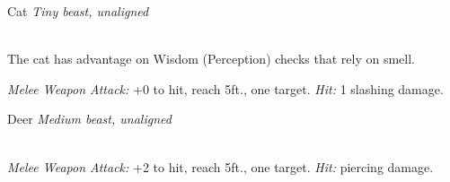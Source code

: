 \documentclass[10pt,twoside,twocolumn,openany]{book}
\begin{document}
\begin{monsterboxnobg}{Cat}
	\textit{Tiny beast, unaligned}\\
	\hline
	\basics[
		armorclass	= 12,
		hitpoints 		= \dice{1d4},
		speed		= {40 ft., climb 30 ft.}
	]
	\hline
	\stats[
		STR	= \stat{3},
		DEX	= \stat{15},
		CON	= \stat{10},
		INT	= \stat{3},
		WIS	= \stat{12},
		CHA	= \stat{7}
	]
	\hline
	\details[
		skills			= {Perception +3, Stealth +4},
		senses		= {passive Perception 13},
		languages		= {-},
		challenge		= 0
	]
	\hline \\[1mm]
	\begin{monsteraction}
		The cat has advantage on Wisdom (Perception) checks that rely on smell.
	\end{monsteraction}
	\begin{monsteraction}[Claws]
		\textit{Melee Weapon Attack:} +0 to hit, reach 5ft., one target. \textit{Hit:} 1 slashing damage.
	\end{monsteraction}
\end{monsterboxnobg}

\begin{monsterboxnobg}{Deer}
	\textit{Medium beast, unaligned}\\
	\hline
	\basics[
		armorclass	= 13,
		hitpoints 		= \dice{1d8},
		speed		= {50 ft.}
	]
	\hline
	\stats[
		STR	= \stat{11},
		DEX	= \stat{16},
		CON	= \stat{11},
		INT	= \stat{2},
		WIS	= \stat{14},
		CHA	= \stat{5}
	]
	\hline
	\details[
		skills			= {},
		senses 		= {passive Perception 12},
		languages		= {-},
		challenge		= 0
	]
	\hline \\[1mm]
	\begin{monsteraction}[Bite]
		\textit{Melee Weapon Attack:} +2 to hit, reach 5ft., one target. \textit{Hit:}  piercing damage.
	\end{monsteraction}
\end{monsterboxnobg}
\end{document}

